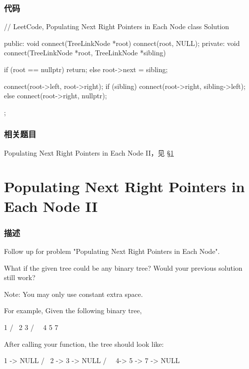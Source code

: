 \subsubsection{代码}

\begin{Code}
// LeetCode, Populating Next Right Pointers in Each Node
class Solution {
public:
    void connect(TreeLinkNode *root) {
        connect(root, NULL);
    }
private:
    void connect(TreeLinkNode *root, TreeLinkNode *sibling) {
        if (root == nullptr)
            return;
        else
            root->next = sibling;

        connect(root->left, root->right);
        if (sibling)
            connect(root->right, sibling->left);
        else
            connect(root->right, nullptr);
    }
};
\end{Code}


\subsubsection{相关题目}
\begindot
\item Populating Next Right Pointers in Each Node II，见 \S \ref{sec:populating-next-right-pointers-in-each-node-ii}
\myenddot



\section{Populating Next Right Pointers in Each Node II} %
\label{sec:populating-next-right-pointers-in-each-node-ii}


\subsubsection{描述}
Follow up for problem "Populating Next Right Pointers in Each Node".

What if the given tree could be any binary tree? Would your previous solution still work?

Note: You may only use constant extra space.

For example,
Given the following binary tree,
\begin{Code}
         1
       /  \
      2    3
     / \    \
    4   5    7
\end{Code}

After calling your function, the tree should look like:
\begin{Code}
         1 -> NULL
       /  \
      2 -> 3 -> NULL
     / \    \
    4-> 5 -> 7 -> NULL
\end{Code}


